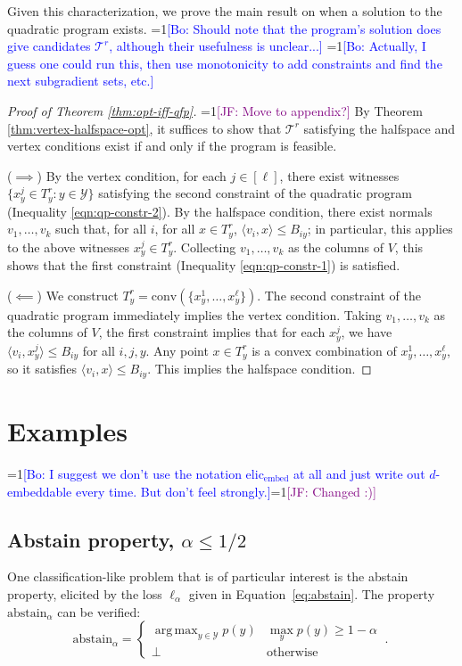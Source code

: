 \documentclass[anon]{colt2020} %
\newcommand{\Comments}{1}
\newcommand{\mynote}[2]{\ifnum\Comments=1\textcolor{#1}{#2}\fi}
\newcommand{\jessie}[1]{\mynote{purple}{[JF: #1]}}
\newcommand{\bo}[1]{\mynote{blue}{[Bo: #1]}}
\newcommand{\elicembed}{\mathrm{elic}_\mathrm{embed}}
\newcommand{\abstain}[1]{\mathrm{abstain}_{#1}}
\newcommand{\T}{\mathcal{T}}
\newcommand{\Y}{\mathcal{Y}}
\newcommand{\ellabs}[1]{\ell_{#1}}
\newcommand{\inprod}[2]{\langle #1, #2 \rangle}%
\newcommand{\conv}{\mathrm{conv}}
\DeclareMathOperator*{\argmax}{arg\,max}
\begin{document}
Given this characterization, we prove the main result on when a solution to the quadratic program exists.
\bo{Should note that the program's solution does give candidates $\T^r$, although their usefulness is unclear...}
\bo{Actually, I guess one could run this, then use monotonicity to add constraints and find the next subgradient sets, etc.}

\begin{proof}[Proof of Theorem \ref{thm:opt-iff-qfp}]
	\jessie{Move to appendix?}
    By Theorem \ref{thm:vertex-halfspace-opt}, it suffices to show that $\T^r$ satisfying the halfspace and vertex conditions exist if and only if the program is feasible.

  ($\implies$)
  By the vertex condition, for each $j \in [\ell]$, there exist witnesses $\{x^j_y \in T^r_y : y \in \Y\}$ satisfying the second constraint of the quadratic program (Inequality \ref{eqn:qp-constr-2}).
  By the halfspace condition, there exist normals $v_1, \dots, v_k$ such that, for all $i$, for all $x \in T^r_y$, $\inprod{v_i}{x} \leq B_{iy}$; in particular, this applies to the above witnesses $x^j_y \in T^r_y$.
  Collecting $v_1,\dots,v_k$ as the columns of $V$, this shows that the first constraint (Inequality \ref{eqn:qp-constr-1}) is satisfied.

  \bigskip
  ($\impliedby$)
  We construct $T^r_y = \conv(\{x^1_y, \ldots, x^{\ell}_y\})$.
  The second constraint of the quadratic program immediately implies the vertex condition.
  Taking $v_1,\dots,v_k$ as the columns of $V$, the first constraint implies that for each $x^j_y$, we have $\inprod{v_i}{x^j_y} \leq B_{iy}$ for all $i,j,y$.
  Any point $x \in T^r_y$ is a convex combination of $x^1_y,\ldots,x^{\ell}_y$, so it satisfies $\inprod{v_i}{x} \leq B_{iy}$.
  This implies the halfspace condition.  %
\end{proof}




\section{Examples}\label{sec:examples}
\bo{I suggest we don't use the notation $\elicembed$ at all and just write out $d$-embeddable every time. But don't feel strongly.}\jessie{Changed :)}
\subsection{Abstain property, $\alpha \leq 1/2$}\label{subsec:example-abstain}
One classification-like problem that is of particular interest is the abstain property, elicited by the loss $\ellabs{\alpha}$ given in Equation~\ref{eq:abstain}.
The property $\abstain{\alpha}$ can be verified:
\begin{equation}\label{eq:abstain-prop}
     \abstain{\alpha} = \begin{cases}
     \argmax_{y \in \Y} p(y) & \max_y p(y) \geq 1 - \alpha\\
     \bot & \text{otherwise}
     \end{cases}~.~
\end{equation}
\end{document}
